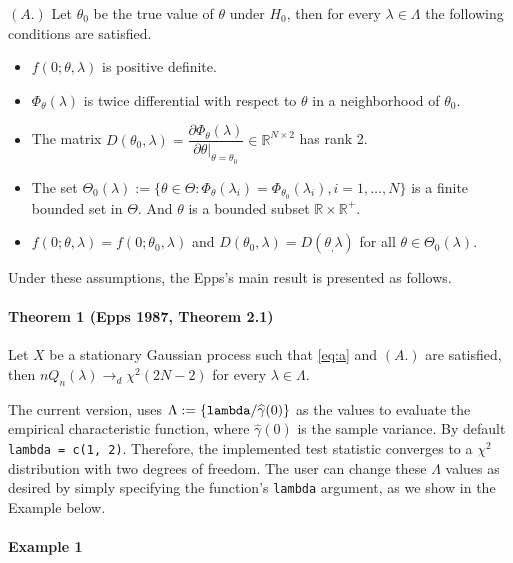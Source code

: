 \((A.)\) Let \(\theta_0\) be the true value of \(\theta\) under \(H_0\), then for every \(\lambda \in \Lambda\) the following conditions are satisfied.

\begin{itemize}
\item
  \(f(0;\theta,\lambda)\) is positive definite.
\item
  \(\Phi_\theta(\lambda)\) is twice differential with respect to \(\theta\) in a neighborhood of \(\theta_0\).
\item
  The matrix \(D(\theta_0,\lambda) = \dfrac{\partial \Phi_\theta(\lambda)}{\partial\theta |_{\theta = \theta_0}} \in \mathbb{R}^{N\times 2}\) has rank 2.
\item
  The set \(\Theta_0(\lambda) := \{ \theta \in \Theta: \Phi_\theta(\lambda_i) = \Phi_{\theta_0}(\lambda_i), i=1, \ldots,N\}\) is a finite bounded set in \(\Theta\). And \(\theta\) is a bounded subset \(\mathbb{R}\times \mathbb{R}^+\).
\item
  \(f(0;\theta,\lambda) = f(0;\theta_0,\lambda)\) and \(D(\theta_0,\lambda) = D(\theta_,\lambda)\) for all \(\theta \in \Theta_0(\lambda)\).
\end{itemize}

Under these assumptions, the Epps's main result is presented as follows.

\hypertarget{theorem-1-epps1987-theorem-2.1}{%
\paragraph{Theorem 1 (Epps 1987, Theorem 2.1)}\label{theorem-1-epps1987-theorem-2.1}}

Let \(X\) be a stationary Gaussian process such that \eqref{eq:a} and \((A.)\) are satisfied, then \(nQ_n(\lambda)\to_d \chi^2(2N - 2)\) for every \(\lambda \in \Lambda\).

The current  version, uses \(\Lambda := \{\verb|lambda|/\widehat{\gamma}(0)\}\) as the values to evaluate the empirical characteristic function, where \(\widehat{\gamma}(0)\) is the sample variance. By default \texttt{lambda\ =\ c(1,\ 2)}. Therefore, the implemented test statistic converges to a \(\chi^2\) distribution with two degrees of freedom. The user can change these \(\Lambda\) values as desired by simply specifying the function's \texttt{lambda} argument, as we show in the Example below.

\hypertarget{example-1}{%
\paragraph{Example 1}\label{example-1}}

